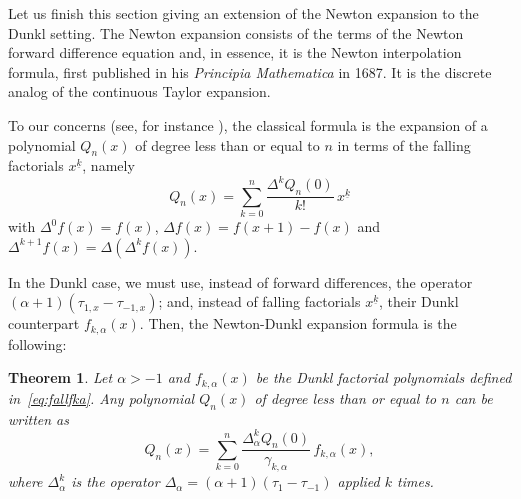 \documentclass[11pt]{article}
\theoremstyle{plain}
\newtheorem{theorem}{Theorem}[section]
\theoremstyle{remark}
\numberwithin{equation}{section} %
\newcommand{\cc}{\gamma}
\begin{document}
Let us finish this section giving an extension of the Newton expansion to the Dunkl setting.
The Newton expansion consists of the terms of the Newton forward difference equation and,
in essence, it is the Newton interpolation formula, first published 
in his \textit{Principia Mathematica} in 1687. It is the discrete analog 
of the continuous Taylor expansion. 

To our concerns (see, for instance \cite[\S\,34, p.~191]{Nor}), the classical formula is the expansion of a polynomial $Q_n(x)$ of degree less than or equal to $n$ in terms of the falling factorials $x^{\underline{k}}$, namely
\begin{equation}
\label{eq:Qnx}
  Q_n(x) = \sum_{k=0}^n \frac{\Delta^kQ_n(0)}{k!}\, x^{\underline{k}}
\end{equation}
with $\Delta^{0} f(x) = f(x)$, $\Delta f(x) = f(x+1)-f(x)$ and $\Delta^{k+1} f(x) = \Delta (\Delta^k f(x))$. 

In the Dunkl case, we must use, instead of forward differences, 
the operator $(\alpha+1)(\tau_{1,x}-\tau_{-1,x})$;
and, instead of falling factorials $x^{\underline{k}}$, 
their Dunkl counterpart $f_{k,\alpha}(x)$. 
Then, the Newton-Dunkl expansion formula is the following:

\begin{theorem}
Let $\alpha>-1$ and $f_{k,\alpha}(x)$ be the Dunkl factorial polynomials defined in~\eqref{eq:fallfka}. 
Any polynomial $Q_n(x)$ of degree less than or equal to $n$ can be written as
\begin{equation}
\label{eq:QnxD}
  Q_n(x) = \sum_{k=0}^n \frac{\Delta_{\alpha}^kQ_n(0)}{\cc_{k,\alpha}}\, f_{k,\alpha}(x),
\end{equation} 
where $\Delta_{\alpha}^k$ is the operator $\Delta_{\alpha} = (\alpha+1)(\tau_{1}-\tau_{-1})$ applied $k$ times.
\end{theorem}
\end{document}
